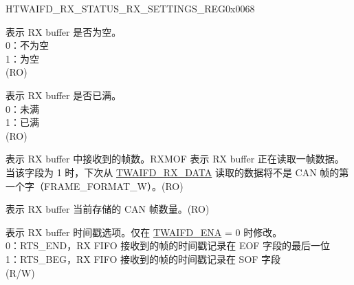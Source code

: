 \begin{register}{H}{TWAIFD\_RX\_STATUS\_RX\_SETTINGS\_REG}{0x0068}\label{regdesc:TWAIFDRXSTATUSRXSETTINGSREG}
%
%
%
%
%
%
%
%
\regnewline%
\begin{regdesc}\begin{reglist}
\label{fielddesc:TWAIFDRXE}\item [TWAIFD\_RXE] 表示 RX buffer 是否为空。\\
0：不为空\\
1：为空\\(RO)
\label{fielddesc:TWAIFDRXF}\item [TWAIFD\_RXF] 表示 RX buffer 是否已满。\\
0：未满\\
1：已满\\(RO)
\label{fielddesc:TWAIFDRXMOF}\item [TWAIFD\_RXMOF] 表示 RX buffer 中接收到的帧数。RXMOF 表示 RX buffer 正在读取一帧数据。当该字段为 1 时，下次从 \hyperref[regdesc:TWAIFDRXDATAREG]{TWAIFD\_RX\_DATA} 读取的数据将不是 CAN 帧的第一个字（FRAME\_FORMAT\_W）。(RO)
\label{fielddesc:TWAIFDRXFRC}\item [TWAIFD\_RXFRC] 表示 RX buffer 当前存储的 CAN 帧数量。(RO)
\label{fielddesc:TWAIFDRTSOP}\item [TWAIFD\_RTSOP] 表示 RX buffer 时间戳选项。仅在 \hyperref[fielddesc:TWAIFDENA]{TWAIFD\_ENA} = 0 时修改。\\
0：RTS\_END，RX FIFO 接收到的帧的时间戳记录在 EOF 字段的最后一位\\
1：RTS\_BEG，RX FIFO 接收到的帧的时间戳记录在 SOF 字段\\(R/W)
\end{reglist}\end{regdesc}
\end{register}


